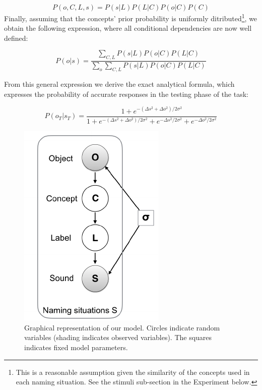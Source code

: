 \documentclass[10pt, letterpaper]{article}
\newenvironment{CodeChunk}{}{}
\begin{document}
\[P(o,C,L,s) = P(s|L)P(L|C)P(o|C)P(C) \] Finally, assuming that the
concepts' prior probability is uniformly
ditributed\footnote{This is a reasonable assumption given the similarity of the concepts used in each naming situation. See the stimuli sub-section in the Experiment below.},
we obtain the following expression, where all conditional dependencies
are now well defined:

\[
P(o|s) = \frac{\sum_{C,L} P(s|L)P(o|C)P(L|C)}{\sum_{o} \sum_{C,L} P(s|L)P(o|C)P(L|C)}
\]

From this general expression we derive the exact analytical formula,
which expresses the probability of accurate responses in the testing
phase of the task:

\begin{equation}
P(o_T|s_T)= \frac{1 + e^{-(\Delta s^2 + \Delta o^2) /2\sigma^2}}{1 + e^{-(\Delta s^2 + \Delta o^2) /2\sigma^2} + e^{-\Delta s^2 /2\sigma^2} + e^{-\Delta o^2 /2\sigma^2 }}
\end{equation}

\begin{CodeChunk}
\begin{figure}[t]

{\centering \includegraphics{figs/model-1} 

}

\caption{\label{fig:model}Graphical representation of our model. Circles indicate random variables (shading indicates observed variables). The squares indicates fixed model parameters.}\label{fig:model}
\end{figure}
\end{CodeChunk}
\end{document}
